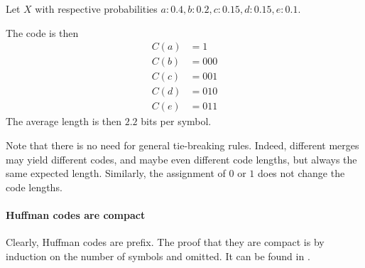 \documentclass[a4paper, 11pt, openany]{book}
\begin{document}
\begin{example} \label{example:huffman}
Let $X$ with respective probabilities $a: 0.4, b: 0.2, c: 0.15, d:0.15, e:0.1$.


The code is then
\begin{align*}
    C(a) &= 1\\
    C(b) &= 000\\
    C(c) &= 001\\
    C(d) &= 010\\
    C(e) &= 011
\end{align*}
The average length is then $2.2$ bits per symbol.
\end{example}


Note that there is no need for general tie-breaking rules. Indeed, different merges may yield different codes, and maybe even different code lengths, but always the same expected length. Similarly, the assignment of $0$ or $1$ does not change the code lengths.



\paragraph{Huffman codes are compact} Clearly, Huffman codes are prefix. The proof that they are compact is by induction on the number of symbols and omitted. It can be found in \cite[Section 5.8]{CT06}.
\end{document}
